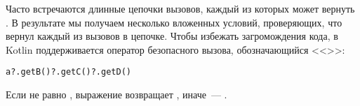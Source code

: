 \begin{description}
Часто встречаются длинные цепочки вызовов, каждый из которых может вернуть . \td В результате мы получаем несколько вложенных условий, проверяющих, что вернул каждый из вызовов в цепочке. Чтобы избежать загромождения кода, в Kotlin поддерживается оператор безопасного вызова, обозначающийся <<>>:
\begin{lstlisting}
a?.getB()?.getC()?.getD()
\end{lstlisting}
Если  не равно , выражение  возвращает , иначе~--- .

\end{description}